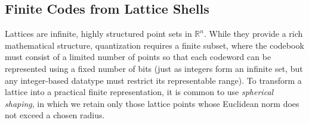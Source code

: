 \documentclass{article}
\theoremstyle{plain}
\theoremstyle{definition}
\theoremstyle{remark}
\begin{document}

\subsection{Finite Codes from Lattice Shells}
\label{sec:finite-codes-from-lattices}

Lattices are infinite, highly structured point sets in $\mathbb{R}^n$. While they provide a rich mathematical structure, quantization requires a finite subset, where the codebook must consist of a limited number of points so that each codeword can be represented using a fixed number of bits (just as integers form an infinite set, but any integer-based datatype must restrict its representable range). To transform a lattice into a practical finite representation, it is common to use \textit{spherical shaping}, in which we retain only those lattice points whose Euclidean norm does not exceed a chosen radius.
\end{document}
